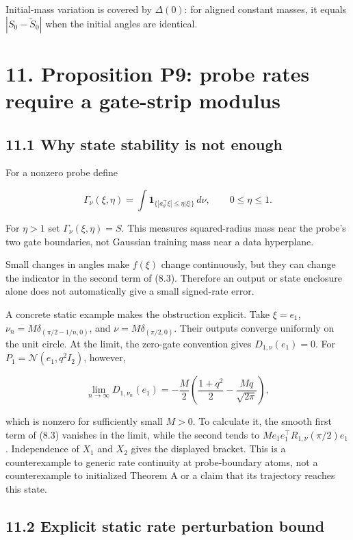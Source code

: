 \documentclass[
  10pt,
]{article}
\begin{document}
Initial-mass variation is covered by \(\Delta(0)\): for aligned constant
masses, it equals \(|S_0-\widetilde S_0|\) when the initial angles are
identical.

\section{11. Proposition P9: probe rates require a gate-strip
modulus}\label{proposition-p9-probe-rates-require-a-gate-strip-modulus}

\subsection{11.1 Why state stability is not
enough}\label{why-state-stability-is-not-enough}

For a nonzero probe define

\[
 \Gamma_\nu(\xi,\eta)=
 \int\mathbf1_{\{|a_\theta^\top\xi|\le\eta|\xi|\}}\,d\nu,
 \qquad 0\le\eta\le1.
 \tag{11.1}
\]

For \(\eta>1\) set \(\Gamma_\nu(\xi,\eta)=S\). This measures
squared-radius mass near the probe's two gate boundaries, not Gaussian
training mass near a data hyperplane.

Small changes in angles make \(f(\xi)\) change continuously, but they
can change the indicator in the second term of (8.3). Therefore an
output or state enclosure alone does not automatically give a small
signed-rate error.

A concrete static example makes the obstruction explicit. Take
\(\xi=e_1\), \(\nu_n=M\delta_{(\pi/2-1/n,0)}\), and
\(\nu=M\delta_{(\pi/2,0)}\). Their outputs converge uniformly on the
unit circle. At the limit, the zero-gate convention gives
\(D_{1,\nu}(e_1)=0\). For \(P_1=\mathcal N(e_1,q^2I_2)\), however,

\[
 \lim_{n\to\infty}D_{1,\nu_n}(e_1)
 =-\frac M2\left(\frac{1+q^2}{2}-\frac{Mq}{\sqrt{2\pi}}\right),
\]

which is nonzero for sufficiently small \(M>0\). To calculate it, the
smooth first term of (8.3) vanishes in the limit, while the second tends
to \(M e_1 e_1^\top R_{1,\nu}(\pi/2)e_1\). Independence of \(X_1\) and
\(X_2\) gives the displayed bracket. This is a counterexample to generic
rate continuity at probe-boundary atoms, not a counterexample to
initialized Theorem A or a claim that its trajectory reaches this state.

\subsection{11.2 Explicit static rate perturbation
bound}\label{explicit-static-rate-perturbation-bound}
\end{document}
